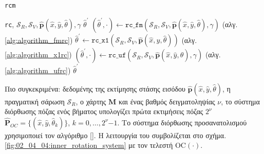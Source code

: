 \begin{algorithm}[!h]
  \caption{\texttt{rcm}}
  \begin{spacing}{1.5}
  \begin{algorithmic}[1]
    \REQUIRE \texttt{rc}, $\mathcal{S}_R, \mathcal{S}_V, \hat{\bm{p}}(\hat{x}, \hat{y}, \hat{\theta}), \gamma$
    \ENSURE $\hat{\theta}^\prime$
      \STATE $(\hat{\theta}^\prime, \cdot) \leftarrow \texttt{rc\_fm}(\mathcal{S}_R, \mathcal{S}_V, \hat{\bm{p}}(\hat{x}, \hat{y}, \hat{\theta}), \gamma)$ \hfill (αλγ. \ref{alg:algorithm_fmrc})
      \STATE $\hat{\theta}^\prime \leftarrow \texttt{rc\_x1}(\mathcal{S}_R, \mathcal{S}_V, \hat{\bm{p}}(\hat{x}, \hat{y}, \hat{\theta}))$ \hfill (αλγ. \ref{alg:algorithm_x1rc})
      \STATE $(\hat{\theta}^\prime, \cdot) \leftarrow \texttt{rc\_uf}(\mathcal{S}_R, \mathcal{S}_V, \hat{\bm{p}}(\hat{x}, \hat{y}, \hat{\theta}), \gamma)$ \hfill (αλγ. \ref{alg:algorithm_ufrc})
    \ENDIF
    \RETURN $\hat{\theta}^\prime$
  \end{algorithmic}
  \end{spacing}
  \label{alg:02_04_04:rc}
\end{algorithm}


Πιο συγκεκριμένα: δεδομένης της εκτίμησης στάσης εισόδου
$\hat{\bm{p}}(\hat{x}, \hat{y}, \hat{\theta})$, η πραγματική σάρωση $\mathcal{S}_R$, ο χάρτης $\bm{M}$
και ένας βαθμός δειγματοληψίας $\nu$, το σύστημα διόρθωσης πόζας ενός βήματος
υπολογίζει πρώτα εκτιμήσεις πόζας $2^\nu$ $\hat{\bm{P}}_{OC} = \{(\hat{x},
\hat{y}, \hat{\theta}_k)\}$, $k = 0,\dots,2^\nu$$-$$1$. Το σύστημα διόρθωσης
προσανατολισμού χρησιμοποιεί τον αλγόριθμο \ref{}. Η
λειτουργία του συμβολίζεται στο σχήμα.  \ref{fig:02_04_04:inner_rotation_system} με τον
τελεστή OC$(\cdot)$.

